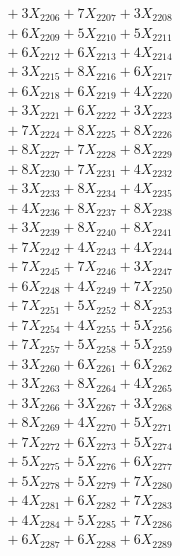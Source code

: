 \documentclass[a4paper,10pt]{article}
\begin{document}
{\begin{align}
&\;  + 3 X_{2206} + 7 X_{2207} + 3 X_{2208} \\[0.3ex]
&\;  + 6 X_{2209} + 5 X_{2210} + 5 X_{2211} \\[0.3ex]
&\;  + 6 X_{2212} + 6 X_{2213} + 4 X_{2214} \\[0.3ex]
&\;  + 3 X_{2215} + 8 X_{2216} + 6 X_{2217} \\[0.3ex]
&\;  + 6 X_{2218} + 6 X_{2219} + 4 X_{2220} \\[0.3ex]
&\;  + 3 X_{2221} + 6 X_{2222} + 3 X_{2223} \\[0.3ex]
&\;  + 7 X_{2224} + 8 X_{2225} + 8 X_{2226} \\[0.3ex]
&\;  + 8 X_{2227} + 7 X_{2228} + 8 X_{2229} \\[0.5ex]\allowbreak
&\;  + 8 X_{2230} + 7 X_{2231} + 4 X_{2232} \\[0.3ex]
&\;  + 3 X_{2233} + 8 X_{2234} + 4 X_{2235} \\[0.3ex]
&\;  + 4 X_{2236} + 8 X_{2237} + 8 X_{2238} \\[0.3ex]
&\;  + 3 X_{2239} + 8 X_{2240} + 8 X_{2241} \\[0.3ex]
&\;  + 7 X_{2242} + 4 X_{2243} + 4 X_{2244} \\[0.3ex]
&\;  + 7 X_{2245} + 7 X_{2246} + 3 X_{2247} \\[0.3ex]
&\;  + 6 X_{2248} + 4 X_{2249} + 7 X_{2250} \\[0.3ex]
&\;  + 7 X_{2251} + 5 X_{2252} + 8 X_{2253} \\[0.3ex]
&\;  + 7 X_{2254} + 4 X_{2255} + 5 X_{2256} \\[0.3ex]
&\;  + 7 X_{2257} + 5 X_{2258} + 5 X_{2259} \\[0.5ex]\allowbreak
&\;  + 3 X_{2260} + 6 X_{2261} + 6 X_{2262} \\[0.3ex]
&\;  + 3 X_{2263} + 8 X_{2264} + 4 X_{2265} \\[0.3ex]
&\;  + 3 X_{2266} + 3 X_{2267} + 3 X_{2268} \\[0.3ex]
&\;  + 8 X_{2269} + 4 X_{2270} + 5 X_{2271} \\[0.3ex]
&\;  + 7 X_{2272} + 6 X_{2273} + 5 X_{2274} \\[0.3ex]
&\;  + 5 X_{2275} + 5 X_{2276} + 6 X_{2277} \\[0.3ex]
&\;  + 5 X_{2278} + 5 X_{2279} + 7 X_{2280} \\[0.3ex]
&\;  + 4 X_{2281} + 6 X_{2282} + 7 X_{2283} \\[0.3ex]
&\;  + 4 X_{2284} + 5 X_{2285} + 7 X_{2286} \\[0.3ex]
&\;  + 6 X_{2287} + 6 X_{2288} + 6 X_{2289} \\[0.5ex]\allowbreak

\end{align}}
\end{document}

